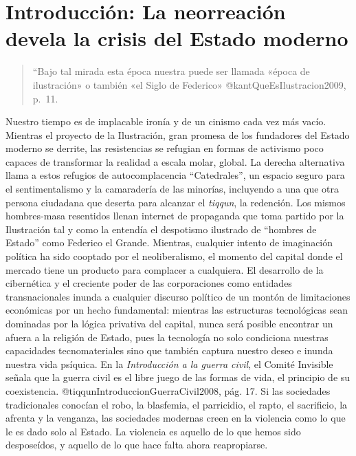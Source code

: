 \documentclass[
]{article}
\begin{document}
\hypertarget{introducciuxf3n-la-neorreaciuxf3n-devela-la-crisis-del-estado-moderno}{%
\section{Introducción: La neorreación devela la crisis del Estado
moderno}\label{introducciuxf3n-la-neorreaciuxf3n-devela-la-crisis-del-estado-moderno}}

\begin{quote}
``Bajo tal mirada esta época nuestra puede ser llamada «época de
ilustración» o también «el Siglo de Federico» @kantQueEsIlustracion2009,
p.~11.
\end{quote}

Nuestro tiempo es de implacable ironía y de un cinismo cada vez más
vacío. Mientras el proyecto de la Ilustración, gran promesa de los
fundadores del Estado moderno se derrite, las resistencias se refugian
en formas de activismo poco capaces de transformar la realidad a escala
molar, global. La derecha alternativa llama a estos refugios de
autocomplacencia ``Catedrales'', un espacio seguro para el
sentimentalismo y la camaradería de las minorías, incluyendo a una que
otra persona ciudadana que deserta para alcanzar el \emph{tiqqun}, la
redención. Los mismos hombres-masa resentidos llenan internet de
propaganda que toma partido por la Ilustración tal y como la entendía el
despotismo ilustrado de ``hombres de Estado'' como Federico el Grande.
Mientras, cualquier intento de imaginación política ha sido cooptado por
el neoliberalismo, el momento del capital donde el mercado tiene un
producto para complacer a cualquiera. El desarrollo de la cibernética y
el creciente poder de las corporaciones como entidades transnacionales
inunda a cualquier discurso político de un montón de limitaciones
económicas por un hecho fundamental: mientras las estructuras
tecnológicas sean dominadas por la lógica privativa del capital, nunca
será posible encontrar un afuera a la religión de Estado, pues la
tecnología no solo condiciona nuestras capacidades tecnomateriales sino
que también captura nuestro deseo e inunda nuestra vida psíquica. En la
\emph{Introducción a la guerra civil}, el Comité Invisible señala que la
guerra civil es el libre juego de las formas de vida, el principio de su
coexistencia. @tiqqunIntroduccionGuerraCivil2008, pág. 17. Si las
sociedades tradicionales conocían el robo, la blasfemia, el parricidio,
el rapto, el sacrificio, la afrenta y la venganza, las sociedades
modernas creen en la violencia como lo que le es dado solo al Estado. La
violencia es aquello de lo que hemos sido desposeídos, y aquello de lo
que hace falta ahora reapropiarse.
\end{document}
